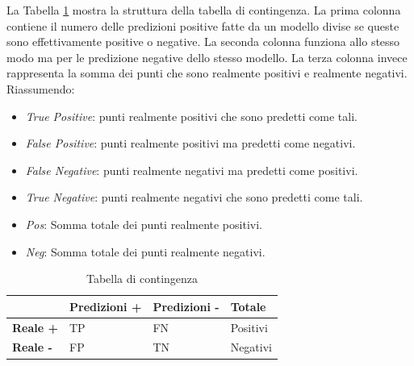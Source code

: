 La Tabella \ref{contigency-table} mostra la struttura della tabella di contingenza.  La prima colonna contiene il numero delle predizioni positive fatte da un modello divise se queste sono effettivamente positive o negative. La seconda colonna funziona allo stesso modo ma per le predizione negative dello stesso modello. La terza colonna invece rappresenta la somma dei punti che sono realmente positivi e realmente negativi.
Riassumendo:
\begin{itemize}
\item \textit{True Positive}: punti realmente positivi che sono predetti come tali.
\item \textit{False Positive}: punti realmente positivi ma predetti come negativi.
\item \textit{False Negative}: punti realmente negativi ma predetti come positivi.
\item \textit{True Negative}: punti realmente negativi che sono predetti come tali.
\item \textit{Pos}: Somma totale dei punti realmente positivi.
\item \textit{Neg}: Somma totale dei punti realmente negativi.
\end{itemize}

\begin{table}[]
\centering
	\caption{\label{contigency-table}Tabella di contingenza}

\begin{tabular}{|l|l|l|l|}
\hline
                 & \textbf{Predizioni +} & \textbf{Predizioni -} & \textbf{Totale} \\ \hline
\textbf{Reale +} & TP                    & FN                    & Positivi        \\ \hline
\textbf{Reale -} & FP                    & TN                    & Negativi        \\ \hline
\end{tabular}
\end{table}

